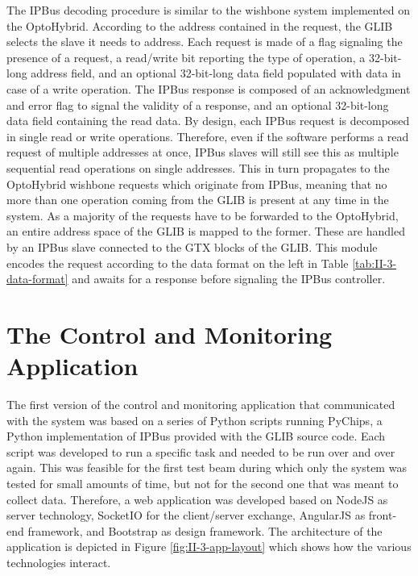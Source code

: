       The IPBus decoding procedure is similar to the wishbone system implemented on the OptoHybrid. According to the address contained in the request, the GLIB selects the slave it needs to address. Each request is made of a flag signaling the presence of a request, a read/write bit reporting the type of operation, a 32-bit-long address field, and an optional 32-bit-long data field populated with data in case of a write operation. The IPBus response is composed of an acknowledgment and error flag to signal the validity of a response, and an optional 32-bit-long data field containing the read data. By design, each IPBus request is decomposed in single read or write operations. Therefore, even if the software performs a read request of multiple addresses at once, IPBus slaves will still see this as multiple sequential read operations on single addresses. This in turn propagates to the OptoHybrid wishbone requests which originate from IPBus, meaning that no more than one operation coming from the GLIB is present at any time in the system. As a majority of the requests have to be forwarded to the OptoHybrid, an entire address space of the GLIB is mapped to the former. These are handled by an IPBus slave connected to the GTX blocks of the GLIB. This module encodes the request according to the data format on the left in Table \ref{tab:II-3-data-format} and awaits for a response before signaling the IPBus controller.

  \section{The Control and Monitoring Application}

    The first version of the control and monitoring application that communicated with the system was based on a series of Python scripts running PyChips, a Python implementation of IPBus provided with the GLIB source code. Each script was developed to run a specific task and needed to be run over and over again. This was feasible for the first test beam during which only the system was tested for small amounts of time, but not for the second one that was meant to collect data. Therefore, a web application was developed based on NodeJS \cite{NODEJS} as server technology, SocketIO \cite{SOCKETIO} for the client/server exchange, AngularJS \cite{ANGULARJS} as front-end framework, and Bootstrap \cite{BOOTSTRAP} as design framework. The architecture of the application is depicted in Figure \ref{fig:II-3-app-layout} which shows how the various technologies interact.

